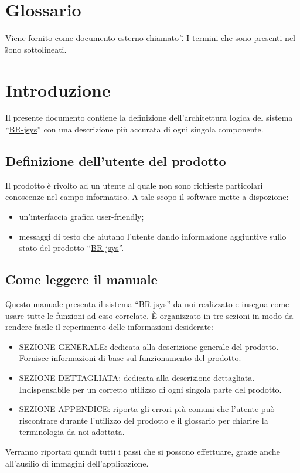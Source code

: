 \chapter*{Glossario}
Viene fornito come documento esterno chiamato \G. I termini che sono presenti nel \G sono sottolineati.


\chapter{Introduzione}
Il presente documento contiene la definizione dell'architettura logica del sistema ``\underline{BR-jsys}'' con una descrizione pi\`u accurata di ogni singola componente.
\section{Definizione dell'utente del prodotto}
Il prodotto \`e rivolto ad un utente al quale non sono richieste particolari conoscenze nel campo informatico. A tale scopo il software mette a dispozione:
\begin{itemize}
\item un'interfaccia grafica user-friendly;
\item messaggi di testo che aiutano l'utente dando informazione aggiuntive sullo stato del prodotto ``\underline{BR-jsys}''.
\end{itemize}
\section{Come leggere il manuale}
Questo manuale presenta il sistema ``\underline{BR-jsys}'' da noi realizzato e insegna come usare tutte le funzioni ad esso correlate. \`E organizzato in tre sezioni in modo da rendere facile il reperimento delle informazioni desiderate:
\begin{itemize}
\item SEZIONE GENERALE: dedicata alla descrizione generale del prodotto. Fornisce informazioni di base sul funzionamento del prodotto.
\item SEZIONE DETTAGLIATA: dedicata alla descrizione dettagliata. Indispensabile per un corretto utilizzo di ogni singola parte del prodotto.
\item SEZIONE APPENDICE: riporta gli errori pi\`u comuni che l'utente pu\`o riscontrare durante l'utilizzo del prodotto e il glossario per chiarire la terminologia da noi adottata.
\end{itemize}
Verranno riportati quindi tutti i passi che si possono effettuare, grazie anche all'ausilio di immagini dell'applicazione.
